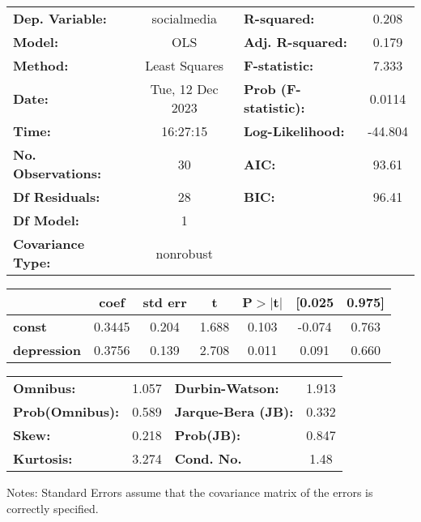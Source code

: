 \begin{center}
\begin{tabular}{lclc}
\toprule
\textbf{Dep. Variable:}    &   socialmedia    & \textbf{  R-squared:         } &     0.208   \\
\textbf{Model:}            &       OLS        & \textbf{  Adj. R-squared:    } &     0.179   \\
\textbf{Method:}           &  Least Squares   & \textbf{  F-statistic:       } &     7.333   \\
\textbf{Date:}             & Tue, 12 Dec 2023 & \textbf{  Prob (F-statistic):} &   0.0114    \\
\textbf{Time:}             &     16:27:15     & \textbf{  Log-Likelihood:    } &   -44.804   \\
\textbf{No. Observations:} &          30      & \textbf{  AIC:               } &     93.61   \\
\textbf{Df Residuals:}     &          28      & \textbf{  BIC:               } &     96.41   \\
\textbf{Df Model:}         &           1      & \textbf{                     } &             \\
\textbf{Covariance Type:}  &    nonrobust     & \textbf{                     } &             \\
\bottomrule
\end{tabular}
\begin{tabular}{lcccccc}
                    & \textbf{coef} & \textbf{std err} & \textbf{t} & \textbf{P$> |$t$|$} & \textbf{[0.025} & \textbf{0.975]}  \\
\midrule
\textbf{const}      &       0.3445  &        0.204     &     1.688  &         0.103        &       -0.074    &        0.763     \\
\textbf{depression} &       0.3756  &        0.139     &     2.708  &         0.011        &        0.091    &        0.660     \\
\bottomrule
\end{tabular}
\begin{tabular}{lclc}
\textbf{Omnibus:}       &  1.057 & \textbf{  Durbin-Watson:     } &    1.913  \\
\textbf{Prob(Omnibus):} &  0.589 & \textbf{  Jarque-Bera (JB):  } &    0.332  \\
\textbf{Skew:}          &  0.218 & \textbf{  Prob(JB):          } &    0.847  \\
\textbf{Kurtosis:}      &  3.274 & \textbf{  Cond. No.          } &     1.48  \\
\bottomrule
\end{tabular}
\end{center}

Notes: \newline
 [1] Standard Errors assume that the covariance matrix of the errors is correctly specified.